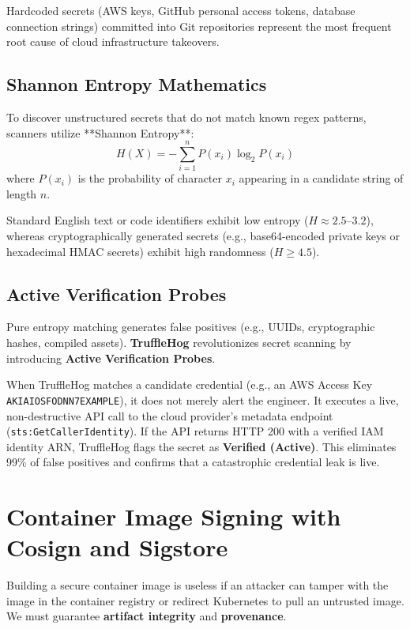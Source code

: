 Hardcoded secrets (AWS keys, GitHub personal access tokens, database connection strings) committed into Git repositories represent the most frequent root cause of cloud infrastructure takeovers.

\subsection{Shannon Entropy Mathematics}
To discover unstructured secrets that do not match known regex patterns, scanners utilize **Shannon Entropy**:
\begin{equation}
H(X) = -\sum_{i=1}^{n} P(x_i) \log_2 P(x_i)
\end{equation}
where $P(x_i)$ is the probability of character $x_i$ appearing in a candidate string of length $n$.

Standard English text or code identifiers exhibit low entropy ($H \approx 2.5$--$3.2$), whereas cryptographically generated secrets (e.g., base64-encoded private keys or hexadecimal HMAC secrets) exhibit high randomness ($H \ge 4.5$).

\subsection{Active Verification Probes}
Pure entropy matching generates false positives (e.g., UUIDs, cryptographic hashes, compiled assets). \textbf{TruffleHog} revolutionizes secret scanning by introducing \textbf{Active Verification Probes}.

When TruffleHog matches a candidate credential (e.g., an AWS Access Key \texttt{AKIAIOSFODNN7EXAMPLE}), it does not merely alert the engineer. It executes a live, non-destructive API call to the cloud provider's metadata endpoint (\texttt{sts:GetCallerIdentity}). If the API returns HTTP 200 with a verified IAM identity ARN, TruffleHog flags the secret as \textbf{Verified (Active)}. This eliminates 99\% of false positives and confirms that a catastrophic credential leak is live.

\section{Container Image Signing with Cosign and Sigstore}

Building a secure container image is useless if an attacker can tamper with the image in the container registry or redirect Kubernetes to pull an untrusted image. We must guarantee \textbf{artifact integrity} and \textbf{provenance}.

